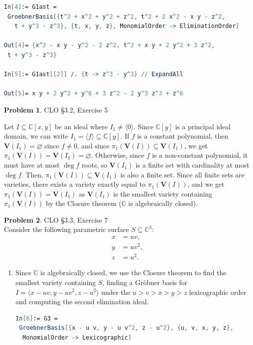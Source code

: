 \documentclass[12pt]{amsart}
\theoremstyle{definition}
\newtheorem{prob}{Problem}
\begin{document}
\begin{flushleft}
\begin{enumerate}
    \begin{lstlisting}[language=Mathematica]
In[4]:= G1ast = 
 GroebnerBasis[{t^2 + x^2 + y^2 + z^2, t^2 + 2 x^2 - x y - z^2, 
   t + y^3 - z^3}, {t, x, y, z}, MonomialOrder -> EliminationOrder]

Out[4]= {x^2 - x y - y^2 - 2 z^2, t^2 + x y + 2 y^2 + 3 z^2, 
 t + y^3 - z^3}

In[5]:= G1ast[[2]] /. {t -> z^3 - y^3} // ExpandAll

Out[5]= x y + 2 y^2 + y^6 + 3 z^2 - 2 y^3 z^3 + z^6
    \end{lstlisting}
\end{enumerate}

\begin{prob} CLO \S3.2, Exercise 5\\
\end{prob}
\bigskip 
Let $I \subseteq \mathbb C[x,y]$ be an ideal where $I_1 \neq \langle 0 \rangle$. Since $\mathbb C[y]$ is a principal ideal domain, we can write $I_1 = \langle f\rangle \subseteq \mathbb C[y]$. If $f$ is a constant polynomial, then $\mathbf V(I_1)=\varnothing$ since $f \neq 0$, and since $\pi_1(\mathbf V(I))\subseteq \mathbf V(I_1)$, we get $\pi_1(\mathbf V(I))= \mathbf V(I_1)=\varnothing$. Otherwise, since $f$ is a non-constant polynomial, it must have at most $\deg f$ roots, so $\mathbf V(I_1)$ is a finite set with cardinality at most $\deg f$. Then, $\pi_1(\mathbf V(I))\subseteq \mathbf V(I_1)$ is also a finite set. Since all finite sets are varieties, there exists a variety exactly equal to $\pi_1 (\mathbf V(I))$, and we get $\pi_1(\mathbf V(I))=\mathbf V(I_1)$ as $\mathbf V(I_1)$ is the smallest variety containing $\pi_1(\mathbf V(I))$ by the Closure theorem ($\mathbb C$ is algebraically closed).

\newpage{}
\begin{prob} CLO \S3.3, Exercise 7 \smallskip
 \\

Consider the following parametric surface $S \subseteq\mathbb C^3$:
\begin{align*}
    x &= uv, \\
    y &= uv^2, \\
    z &= u^2.
\end{align*}
\begin{enumerate}
    \item[(a)] Since $\mathbb C$ is algebraically closed, we use the Closure theorem to find the smallest variety containing $S$, finding a Gr\"obner basis for $I=\langle x-uv,y-uv^2,z-u^2\rangle$ under the $u > v>x>y>z$ lexicographic order and computing the second elimination ideal.
    \begin{lstlisting}[language=Mathematica]
In[6]:= G3 = 
 GroebnerBasis[{x - u v, y - u v^2, z - u^2}, {u, v, x, y, z}, 
  MonomialOrder -> Lexicographic]


\end{lstlisting}
\end{enumerate}
\end{prob}
\end{flushleft}
\end{document}
